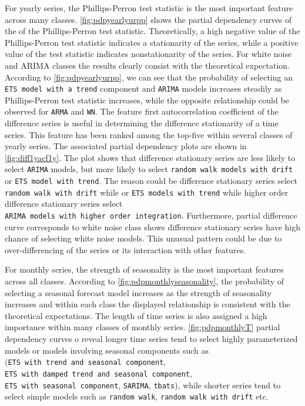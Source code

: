 \documentclass[11pt,a4paper,]{article}
\begin{document}
For yearly series, the Phillips-Perron test statistic is the most important feature across many classes. \autoref{fig:pdpyearlyurpp} shows the partial dependency curves of the of the Phillips-Perron test statistic.
Theoretically, a high negative value of the Phillips-Perron test statistic indicates a stationarity of the series, while a positive value of the test statistic indicates nonstationarity of the series. For white noise and ARIMA classes the results clearly consist with the theoretical expectation. According to \autoref{fig:pdpyearlyurpp}, we can see that the probability of selecting an \texttt{ETS\ model\ with\ a\ trend} component and \texttt{ARIMA} models increases steadily as Phillips-Perron test statistic increases, while the opposite relationship could be observed for \texttt{ARMA} and \texttt{WN}. The feature first autocorrelation coefficient of the difference series is useful in determining the difference stationarity of a time series. This feature has been ranked among the top-five within several classes of yearly series. The associated partial dependency plots are shown in \autoref{fig:diff1yacf1y}. The plot shows that difference stationary series are less likely to select \texttt{ARIMA} models, but more likely to select \texttt{random\ walk\ models\ with\ drift} or \texttt{ETS\ model\ with\ trend}. The reason could be difference stationary series select \texttt{random\ walk\ with\ drift} while or \texttt{ETS\ models\ with\ trend} while higher order difference stationary series select \texttt{ARIMA\ models\ with\ higher\ order\ integration}. Furthermore, partial difference curve corresponds to white noise class shows difference stationary series have high chance of selecting white noise models. This unusual pattern could be due to over-differencing of the series or its interaction with other features.

For monthly series, the strength of seasonality is the most important features across all classes. According to \autoref{fig:pdpmonthlyseasonality}, the probability of selecting a seasonal forecast model increases as the strength of seasonality increases and within each class the displayed relationship is consistent with the theoretical expectations. The length of time series is also assigned a high importance within many classes of monthly series. \autoref{fig:pdpmonthlyT} partial dependency curves o reveal longer time series tend to select highly parameterized models or models involving seasonal components such as (\texttt{ETS\ with\ trend\ and\ seasonal\ component}, \texttt{ETS\ with\ damped\ trend\ and\ seasonal\ component}, \texttt{ETS\ with\ seasonal\ component}, \texttt{SARIMA}, \texttt{tbats}), while shorter series tend to select simple models such as \texttt{random\ walk}, \texttt{random\ walk\ with\ drift} etc.
\end{document}
